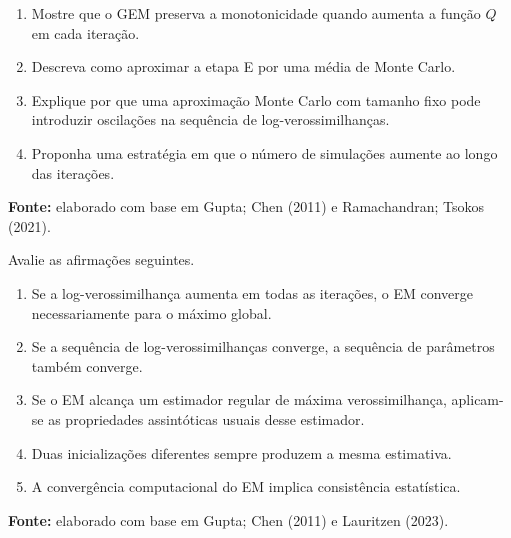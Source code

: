 \documentclass[
  letterpaper,
  DIV=11,
  numbers=noendperiod]{scrreprt}
\providecommand{\tightlist}{%
  \setlength{\itemsep}{0pt}\setlength{\parskip}{0pt}}\usepackage{longtable,booktabs,array}
\begin{document}
\begin{tcolorbox}[enhanced jigsaw, colback=white, leftrule=.75mm, colbacktitle=quarto-callout-note-color!10!white, breakable, titlerule=0mm, bottomtitle=1mm, title=\textcolor{quarto-callout-note-color}{\faInfo}\hspace{0.5em}{Exercício 9 --- GEM e MCEM}, colframe=quarto-callout-note-color-frame, toprule=.15mm, opacityback=0, bottomrule=.15mm, opacitybacktitle=0.6, arc=.35mm, toptitle=1mm, rightrule=.15mm, coltitle=black, left=2mm]

\begin{enumerate}
\def\labelenumi{\arabic{enumi}.}
\tightlist
\item
  Mostre que o GEM preserva a monotonicidade quando aumenta a função
  \(Q\) em cada iteração.
\item
  Descreva como aproximar a etapa E por uma média de Monte Carlo.
\item
  Explique por que uma aproximação Monte Carlo com tamanho fixo pode
  introduzir oscilações na sequência de log-verossimilhanças.
\item
  Proponha uma estratégia em que o número de simulações aumente ao longo
  das iterações.
\end{enumerate}

\textbf{Fonte:} elaborado com base em Gupta; Chen (2011) e Ramachandran;
Tsokos (2021).

\end{tcolorbox}

\begin{tcolorbox}[enhanced jigsaw, colback=white, leftrule=.75mm, colbacktitle=quarto-callout-note-color!10!white, breakable, titlerule=0mm, bottomtitle=1mm, title=\textcolor{quarto-callout-note-color}{\faInfo}\hspace{0.5em}{Exercício 10 --- propriedades do estimador e do algoritmo}, colframe=quarto-callout-note-color-frame, toprule=.15mm, opacityback=0, bottomrule=.15mm, opacitybacktitle=0.6, arc=.35mm, toptitle=1mm, rightrule=.15mm, coltitle=black, left=2mm]

Avalie as afirmações seguintes.

\begin{enumerate}
\def\labelenumi{\arabic{enumi}.}
\tightlist
\item
  Se a log-verossimilhança aumenta em todas as iterações, o EM converge
  necessariamente para o máximo global.
\item
  Se a sequência de log-verossimilhanças converge, a sequência de
  parâmetros também converge.
\item
  Se o EM alcança um estimador regular de máxima verossimilhança,
  aplicam-se as propriedades assintóticas usuais desse estimador.
\item
  Duas inicializações diferentes sempre produzem a mesma estimativa.
\item
  A convergência computacional do EM implica consistência estatística.
\end{enumerate}

\textbf{Fonte:} elaborado com base em Gupta; Chen (2011) e Lauritzen
(2023).

\end{tcolorbox}
\end{document}
